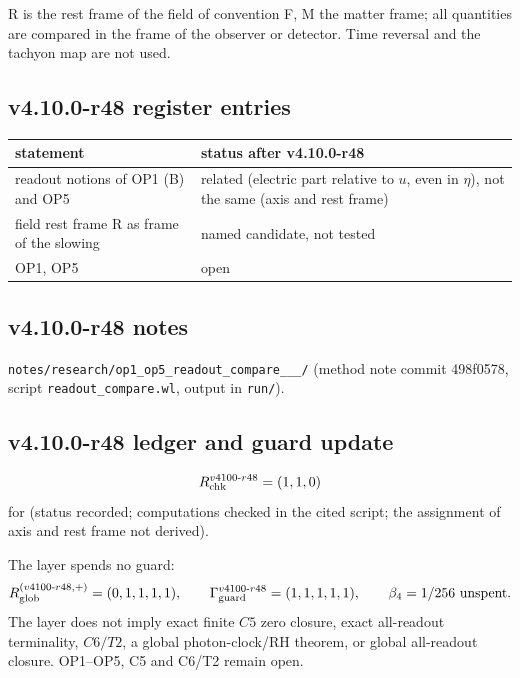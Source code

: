 R is the rest frame of the field of convention F, M the matter frame; all quantities are compared in the frame of the observer or detector.  Time
reversal and the tachyon map are not used.

\subsection*{v4.10.0-r48 register entries}
\label{subsec:v4100-r48-register}

\begin{center}
\small
\begin{tabular}{@{}>{\raggedright\arraybackslash}p{}>{\raggedright\arraybackslash}p{}@{}}
\toprule
statement & status after v4.10.0-r48\\
\midrule
readout notions of OP1 (B) and OP5 & related (electric part relative to \(u\), even in \(\eta\)), not the same (axis and rest frame)\\
field rest frame R as frame of the slowing & named candidate, not tested\\
OP1, OP5 & open\\
\bottomrule
\end{tabular}
\end{center}

\subsection*{v4.10.0-r48 notes}
\label{subsec:v4100-r48-notes}

\texttt{notes/\allowbreak research/\allowbreak op1\_\allowbreak op5\_\allowbreak readout\_\allowbreak compare\_\_\_/} (method note commit 498f0578,
script \texttt{readout\_\allowbreak compare.wl}, output in \texttt{run/}).

\subsection*{v4.10.0-r48 ledger and guard update}
\label{subsec:v4100-r48-ledger-guard}

\[
R_{\rm chk}^{v4100\text{-}r48}=(1,1,0)
\]
for (status recorded; computations checked in the cited script; the assignment of axis and rest frame not derived).

The layer spends no guard:
\[
R_{\rm glob}^{(v4100\text{-}r48,+)}=(0,1,1,1,1),
\qquad
\Gamma_{\rm guard}^{v4100\text{-}r48}=(1,1,1,1,1),
\qquad
\beta_4=1/256\ \text{unspent}.
\]
The layer does not imply exact finite \(C5\) zero closure, exact all-readout terminality, \(C6/T2\), a global photon-clock/RH theorem,
or global all-readout closure.  OP1--OP5, C5 and C6/T2 remain open.
